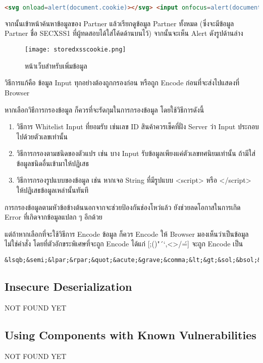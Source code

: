  \begin{lstlisting}[language=html,numbers=none] 
<svg onload=alert(document.cookie)></svg> <input onfocus=alert(document.cookie) autofocus>
\end{lstlisting}

จากนั้นเข้าหน้าค้นหาข้อมูลของ Partner แล้วเรียกดูข้อมูล Partner ทั้งหมด (ซึ่งจะมีข้อมูล Partner ชื่อ SECXSS1 ที่ผู้ทดสอบได้ใส่โค้ดด้านบนไว้) จากนั้นจะเห็น Alert ดังรูปด้านล่าง

\begin{figure}[h]
	\centering
	\texttt{[image: storedxsscookie.png]}
	\caption{หน้าเว็บสำหรับเพิ่มข้อมูล}
	\label{Fig:storedxsscookie.png}
\end{figure}

วิธีการแก้คือ ข้อมูล Input ทุกอย่างต้องถูกกรองก่อน หรือถูก Encode ก่อนที่จะส่งไปแสดงที่ Browser

หากเลือกวิธีการกรองข้อมูล ก็ควรที่จะรัดกุมในการกรองข้อมูล โดยใช้วิธีการดังนี้

\begin{enumerate}
	\item วิธีการ Whitelist Input ที่ยอมรับ เช่นเลข ID สินค้าควรเช็คที่ฝั่ง Server ว่า Input ประกอบไปด้วยตัวเลขเท่านั้น
	\item วิธีการกรองตามชนิดของตัวแปร เช่น บาง Input รับข้อมูลเพียงแค่ตัวเลขทศนิยมเท่านั้น ถ้ามีใส่ข้อมูลชนิดอื่นเข้ามาให้ปฏิเสธ
	\item วิธีการกรองรูปแบบของข้อมูล เช่น หากเจอ String ที่มีรูปแบบ <script> หรือ </script> ให้ปฏิเสธข้อมูลเหล่านั้นทันที
\end{enumerate}

การกรองข้อมูลตามหัวข้อข้างต้นนอกจากจะช่วยป้องกันช่องโหว่แล้ว ยังช่วยลดโอกาสในการเกิด Error ที่เกิดจากข้อมูลแปลก ๆ อีกด้วย

แต่ถ้าหากเลือกที่จะใช้วิธีการ Encode ข้อมูล ก็ควร Encode ให้ Browser มองเห็นว่าเป็นข้อมูลไม่ใช่คำสั่ง โดยที่ตัวอักขระพิเศษที่จะถูก Encode ได้แก่ [;()"´`,<>/\'=] จะถูก Encode เป็น

 \begin{lstlisting}[numbers=none]
&lsqb;&semi;&lpar;&rpar;&quot;&acute;&grave;&comma;&lt;&gt;&sol;&bsol;&apos;&equals;&rsqb;
\end{lstlisting}

\subsection{Insecure Deserialization}
NOT FOUND YET
\subsection{Using Components with Known Vulnerabilities}
NOT FOUND YET
